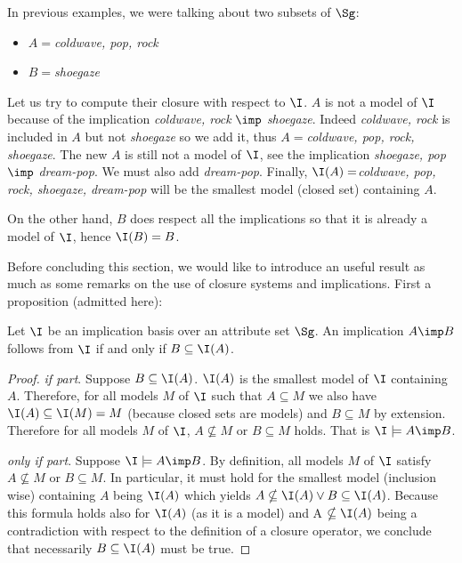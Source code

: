 \noindent In previous examples, we were talking about two subsets of $\Sg$:
\begin{itemize}
	\item $ A = $\textit{coldwave, pop, rock}
	\item $B = $\textit{shoegaze}
\end{itemize}

\noindent Let us try to compute their closure with respect to $\I$. $A$ is not
a model of $\I$ because of the implication \textit{coldwave, rock}  $\imp$ 
\textit{shoegaze}.  Indeed \textit{coldwave, rock} is included in $A$ but not
\textit{shoegaze} so we add it, thus $A = $\textit{coldwave, pop, 
rock, shoegaze}. The new $A$ is still not a model of $\I$, see the implication
\textit{shoegaze, pop} $\imp$ \textit{dream-pop}. We must also add 
\textit{dream-pop}. Finally, $\I(A) = $\textit{coldwave, pop, rock, 
shoegaze, dream-pop} will be the smallest model (closed set) containing $A$.

On the other hand, $B$ does respect all the implications so that it is already 
a model of $\I$, hence $\I(B) = B$.

\vspace{1.2em}

Before concluding this section, we would like to introduce an useful result as
much as some remarks on the use of closure systems and implications. First 
a proposition (admitted here):

\begin{proposition} Let $\I$ be an implication basis over an attribute set 
$\Sg$. An implication $A \imp B$ follows from $\I$ if and only if $B \subseteq 
\I(A)$.
\end{proposition}

\begin{proof} \textit{if part}. Suppose $B \subseteq \I(A)$. $\I(A)$ is the
smallest model of $\I$ containing $A$. Therefore, for all models $M$ of $\I$
such that $A \subseteq M$ we also have $\I(A) \subseteq \I(M) = M$ (because
closed sets are models) and $B \subseteq M$ by extension. Therefore for all
models $M$ of $\I$, $A \nsubseteq M$ or $B \subseteq M$ holds. That is 
$\I \models A \imp B$.

\vspace{1.2em}

\textit{only if part}. Suppose $\I \models A \imp B$. By definition, all models
$M$ of $\I$ satisfy $A \nsubseteq M$ or $B \subseteq M$. In particular, it must
hold for the smallest model (inclusion wise) containing $A$ being $\I(A)$ which
yields $A \nsubseteq \I(A) \lor B \subseteq \I(A)$. Because this formula holds 
also
for $\I(A)$ (as it is a model) and A $\nsubseteq \I(A)$ being a contradiction
with respect to the definition of a closure operator, we conclude that 
necessarily $B \subseteq \I(A)$ must be true.

\end{proof}


